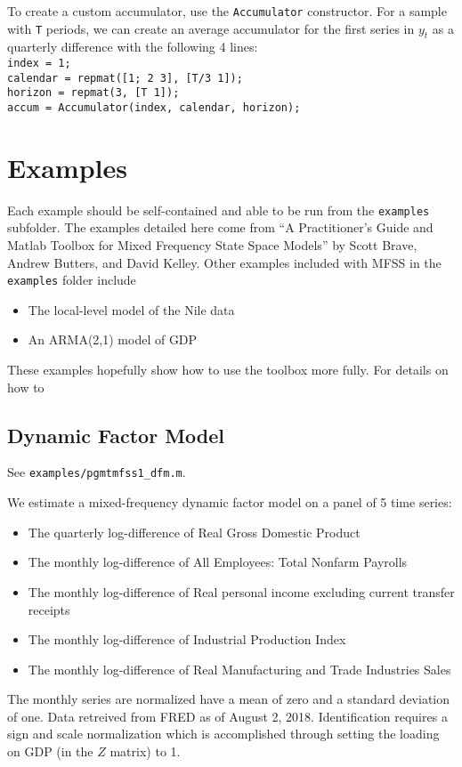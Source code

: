\documentclass{article}
\begin{document}
To create a custom accumulator, use the \texttt{Accumulator} constructor. For a sample with \texttt{T} periods, we can create an average accumulator for the first series in $y_t$ as a quarterly difference with the following 4 lines: \\
  \hphantom{5mm} \texttt{index = 1;} \\ 
  \hphantom{5mm} \texttt{calendar = repmat([1; 2 3], [T/3 1]);} \\ 
  \hphantom{5mm} \texttt{horizon = repmat(3, [T 1]);} \\ 
  \hphantom{5mm} \texttt{accum = Accumulator(index, calendar, horizon);}


\section{Examples}

Each example should be self-contained and able to be run from the \texttt{examples} subfolder. The examples detailed here come from ``A Practitioner's Guide and Matlab Toolbox for Mixed Frequency State Space Models'' by Scott Brave, Andrew Butters, and David Kelley. Other examples included with MFSS in the \texttt{examples} folder include 
\begin{itemize}
  \item The local-level model of the Nile data
  \item An ARMA(2,1) model of GDP
\end{itemize}

These examples hopefully show how to use the toolbox more fully. For details on how to 

\subsection{Dynamic Factor Model}

See \texttt{examples/pgmtmfss1\_dfm.m}. 

We estimate a mixed-frequency dynamic factor model on a panel of 5 time series: 
\begin{itemize}
  \item The quarterly log-difference of Real Gross Domestic Product
  \item The monthly log-difference of All Employees: Total Nonfarm Payrolls
  \item The monthly log-difference of Real personal income excluding current transfer receipts
  \item The monthly log-difference of Industrial Production Index
  \item The monthly log-difference of Real Manufacturing and Trade Industries Sales
\end{itemize}
The monthly series are normalized have a mean of zero and a standard deviation of one. Data retreived from FRED as of August 2, 2018. Identification requires a sign and scale normalization which is accomplished through setting the loading on GDP (in the $Z$ matrix) to 1. 
\end{document}
